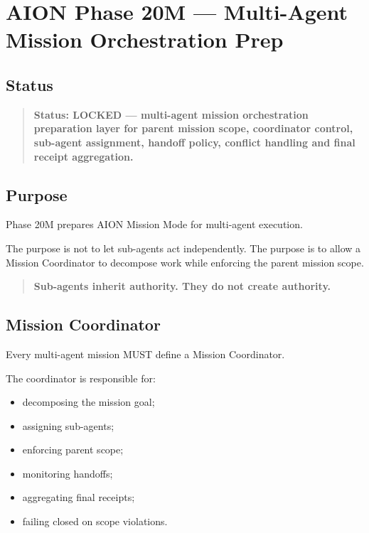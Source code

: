 \section{AION Phase 20M --- Multi-Agent Mission Orchestration Prep}
\label{sec:aion-phase20m-multi-agent-orchestration}

\subsection{Status}

\begin{quote}
\textbf{Status: LOCKED --- multi-agent mission orchestration preparation layer for parent mission scope, coordinator control, sub-agent assignment, handoff policy, conflict handling and final receipt aggregation.}
\end{quote}

\subsection{Purpose}

Phase 20M prepares AION Mission Mode for multi-agent execution.

The purpose is not to let sub-agents act independently. The purpose is to allow a Mission Coordinator to decompose work while enforcing the parent mission scope.

\begin{quote}
\textbf{Sub-agents inherit authority. They do not create authority.}
\end{quote}

\subsection{Mission Coordinator}

Every multi-agent mission MUST define a Mission Coordinator.

The coordinator is responsible for:

\begin{itemize}
  \item decomposing the mission goal;
  \item assigning sub-agents;
  \item enforcing parent scope;
  \item monitoring handoffs;
  \item aggregating final receipts;
  \item failing closed on scope violations.
\end{itemize}


